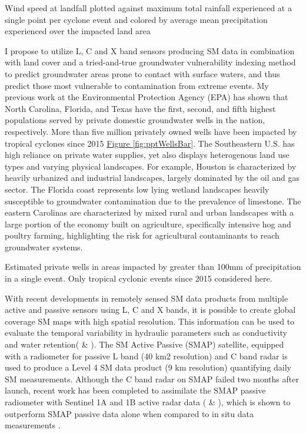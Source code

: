 \documentclass[
]{book}
\begin{document}
\hypertarget{htmlwidget-eccaa36fbe8ecb00120c}{}

\label{fig:stormPts}Wind speed at landfall plotted against maximum total rainfall experienced at a single point per cyclone event and colored by average mean precipitation experienced over the impacted land area

I propose to utilize L, C and X band sensors producing SM data in combination with land cover and a tried-and-true groundwater vulnerability indexing method to predict groundwater areas prone to contact with surface waters, and thus predict those most vulnerable to contamination from extreme events. My previous work at the Environmental Protection Agency (EPA) has shown that North Carolina, Florida, and Texas have the first, second, and fifth highest populations served by private domestic groundwater wells in the nation, respectively\citep{murray2020}. More than five million privately owned wells have been impacted by tropical cyclones since 2015 \protect\hyperlink{fig:pptWellsBar}{Figure \ref{fig:pptWellsBar}}. The Southeastern U.S. has high reliance on private water supplies, yet also displays heterogenous land use types and varying physical landscapes. For example, Houston is characterized by heavily urbanized and industrial landscapes, largely dominated by the oil and gas sector. The Florida coast represents low lying wetland landscapes heavily susceptible to groundwater contamination due to the prevalence of limestone. The eastern Carolinas are characterized by mixed rural and urban landscapes with a large portion of the economy built on agriculture, specifically intensive hog and poultry farming, highlighting the risk for agricultural contaminants to reach groundwater systems.\\

\hypertarget{htmlwidget-07c73a8e85e69c307290}{}

\label{fig:pptWellsBar}Estimated private wells in areas impacted by greater than 100mm of precipitation in a single event. Only tropical cyclonic events since 2015 considered here.

With recent developments in remotely sensed SM data products from multiple active and passive sensors using L, C and X bands, it is possible to create global coverage SM maps with high spatial resolution\citep{mohanty2017}. This information can be used to evaluate the temporal variability in hydraulic parameters such as conductivity and water retention(\citet{ahuja1993} \& \citet{chen1993}). The SM Active Passive (SMAP) satellite, equipped with a radiometer for passive L band (40 km2 resolution) and C band radar is used to produce a Level 4 SM data product (9 km resolution) quantifying daily SM measurements\citep{reichle2017}. Although the C band radar on SMAP failed two months after launch, recent work has been completed to assimilate the SMAP passive radiometer with Sentinel 1A and 1B active radar data (\citet{das2018} \& \citet{santi2018}), which is shown to outperform SMAP passive data alone when compared to in situ data measurements \citep{lievens2017}.
\end{document}
